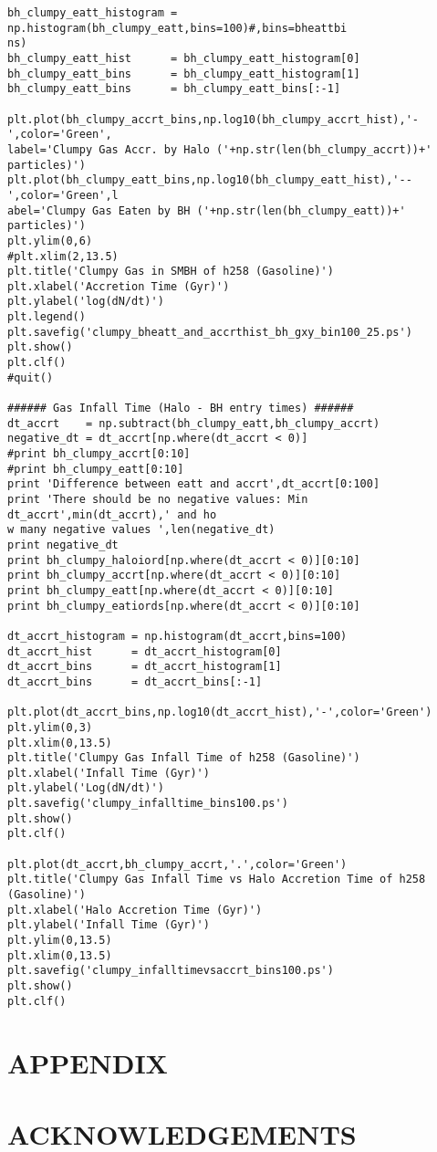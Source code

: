 \documentclass[12pt,headA,chapB]{fiskthesis}
\begin{document}
\begin{verbatim}
bh_clumpy_eatt_histogram = np.histogram(bh_clumpy_eatt,bins=100)#,bins=bheattbi
ns)
bh_clumpy_eatt_hist      = bh_clumpy_eatt_histogram[0]
bh_clumpy_eatt_bins      = bh_clumpy_eatt_histogram[1]
bh_clumpy_eatt_bins      = bh_clumpy_eatt_bins[:-1]

plt.plot(bh_clumpy_accrt_bins,np.log10(bh_clumpy_accrt_hist),'-',color='Green',
label='Clumpy Gas Accr. by Halo ('+np.str(len(bh_clumpy_accrt))+' particles)')
plt.plot(bh_clumpy_eatt_bins,np.log10(bh_clumpy_eatt_hist),'--',color='Green',l
abel='Clumpy Gas Eaten by BH ('+np.str(len(bh_clumpy_eatt))+' particles)')
plt.ylim(0,6)
#plt.xlim(2,13.5)
plt.title('Clumpy Gas in SMBH of h258 (Gasoline)')
plt.xlabel('Accretion Time (Gyr)')
plt.ylabel('log(dN/dt)')
plt.legend()
plt.savefig('clumpy_bheatt_and_accrthist_bh_gxy_bin100_25.ps')
plt.show()
plt.clf()
#quit()

###### Gas Infall Time (Halo - BH entry times) ######
dt_accrt    = np.subtract(bh_clumpy_eatt,bh_clumpy_accrt)
negative_dt = dt_accrt[np.where(dt_accrt < 0)]
#print bh_clumpy_accrt[0:10]
#print bh_clumpy_eatt[0:10]
print 'Difference between eatt and accrt',dt_accrt[0:100]
print 'There should be no negative values: Min dt_accrt',min(dt_accrt),' and ho
w many negative values ',len(negative_dt)
print negative_dt
print bh_clumpy_haloiord[np.where(dt_accrt < 0)][0:10]
print bh_clumpy_accrt[np.where(dt_accrt < 0)][0:10]
print bh_clumpy_eatt[np.where(dt_accrt < 0)][0:10]
print bh_clumpy_eatiords[np.where(dt_accrt < 0)][0:10]

dt_accrt_histogram = np.histogram(dt_accrt,bins=100)
dt_accrt_hist      = dt_accrt_histogram[0]
dt_accrt_bins      = dt_accrt_histogram[1]
dt_accrt_bins      = dt_accrt_bins[:-1]

plt.plot(dt_accrt_bins,np.log10(dt_accrt_hist),'-',color='Green')
plt.ylim(0,3)
plt.xlim(0,13.5)
plt.title('Clumpy Gas Infall Time of h258 (Gasoline)')
plt.xlabel('Infall Time (Gyr)')
plt.ylabel('Log(dN/dt)')
plt.savefig('clumpy_infalltime_bins100.ps')
plt.show()
plt.clf()

plt.plot(dt_accrt,bh_clumpy_accrt,'.',color='Green')
plt.title('Clumpy Gas Infall Time vs Halo Accretion Time of h258 (Gasoline)')
plt.xlabel('Halo Accretion Time (Gyr)')
plt.ylabel('Infall Time (Gyr)')
plt.ylim(0,13.5)
plt.xlim(0,13.5)
plt.savefig('clumpy_infalltimevsaccrt_bins100.ps')
plt.show()
plt.clf()
\end{verbatim}


\thispagestyle{empty}

\chapter{APPENDIX}
\thispagestyle{empty}

\chapter*{ACKNOWLEDGEMENTS}
\thispagestyle{empty}

\renewcommand{\thepage}{}\renewcommand{\thepage}{}

\end{document}
